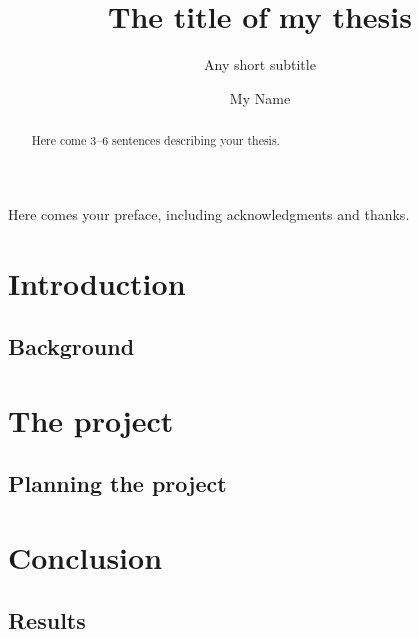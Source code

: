 \documentclass[UKenglish]{uiomaster}  %
\title{The title of my thesis}        %
\subtitle{Any short subtitle}         %
\author{My Name}                      %
\begin{document}
\uiomasterfp[dept={Department of Physics},  %
  program={Physics},                        %
  supervisor={The Name},                    %
  master,                                   %
  long]                                     %

\frontmatter{}
\begin{abstract}
  Here come 3--6 sentences describing your thesis.
\end{abstract}

\tableofcontents{}
\listoffigures{}
\listoftables{}

\begin{preface}
  Here comes your preface, including acknowledgments and thanks.
\end{preface}

\mainmatter{}
\part{Introduction}                   %
\chapter{Background}                  %

\part{The project}                    %
\chapter{Planning the project}        %

\part{Conclusion}                     %
\chapter{Results}                     %

\backmatter{}
\printbibliography{}
\end{document}
